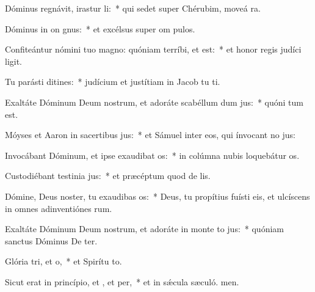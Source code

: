 \item Dóminus regnávit, irastur li:~* qui sedet super Chérubim, moveá ra.
\item Dóminus in on gnus:~* et excélsus super om pulos.
\item Confiteántur nómini tuo magno: quóniam terríbi, et  est:~* et honor regis judíci ligit.
\item Tu parásti ditines:~* judícium et justítiam in Jacob tu ti.
\item Exaltáte Dóminum Deum nostrum, et adoráte scabéllum dum jus:~* quóni tum est.
\item Móyses et Aaron in sacertibus jus:~* et Sámuel inter eos, qui ínvocant no jus:
\item Invocábant Dóminum, et ipse exaudibat os:~* in colúmna nubis loquebátur  os.
\item Custodiébant testinia jus:~* et præcéptum quod de lis.
\item Dómine, Deus noster, tu exaudibas os:~* Deus, tu propítius fuísti eis, et ulcíscens in omnes adinventiónes rum.
\item Exaltáte Dóminum Deum nostrum, et adoráte in monte to jus:~* quóniam sanctus Dóminus De ter.
\item Glória tri, et o,~* et Spirítu to.
\item Sicut erat in princípio, et , et per,~* et in sǽcula sæculó. men.
